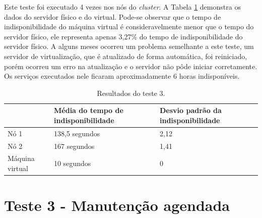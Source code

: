 
Este teste foi executado 4 vezes nos nós do \textit{cluster}. A Tabela \ref{tab:teste3resultados} demonstra os dados do servidor físico e do virtual.
Pode-se observar que o tempo de indisponibilidade do máquina virtual é consideravelmente menor que o tempo do servidor físico, ele representa 
apenas 3,27\% do tempo de indisponibilidade do servidor físico. 
A alguns meses ocorreu um problema semelhante a este teste, um servidor de virtualização, que é atualizado de forma automática, foi reiniciado, 
porém ocorreu um erro na atualização e o servidor não pôde iniciar corretamente. Os serviços executados nele ficaram aproximadamente 
6 horas indisponíveis.

\begin{table}[h!]
\caption{Resultados do teste 3.}
\label{tab:teste3resultados}
\begin{center}
\begin{tabular}{|l|l|l|}\hline
 & \textbf{Média do tempo de indisponibilidade} & \textbf{Desvio padrão da indisponibilidade} \\\hline
Nó 1 & 138,5 segundos & 2,12 \\\hline
Nó 2 & 167 segundos & 1,41 \\\hline
Máquina virtual & 10 segundos & 0 \\\hline
\end{tabular}
\end{center}
\end{table}


\section{Teste 3 - Manutenção agendada}

